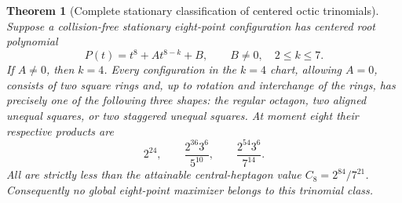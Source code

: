 \documentclass[11pt]{article}
\newtheorem{theorem}{Theorem}[section]
\theoremstyle{remark}
\numberwithin{equation}{section}
\begin{document}
\begin{theorem}[Complete stationary classification of centered octic trinomials]
\label{thm:eight-trinomial-classification}
Suppose a collision-free stationary eight-point configuration has
centered root polynomial
\[
 P(t)=t^8+A t^{8-k}+B,\qquad B\ne0,\quad 2\le k\le7.
\]
If $A\ne0$, then $k=4$. Every configuration in the $k=4$ chart,
allowing $A=0$, consists of two square rings and, up to rotation
and interchange of the rings, has precisely one of the following three shapes:
the regular octagon, two aligned unequal squares, or two staggered
unequal squares. At moment eight their respective products are
\begin{equation}\label{eq:eight-two-square-values}
 2^{24},\qquad \frac{2^{36}3^6}{5^{10}},\qquad
 \frac{2^{54}3^6}{7^{14}}.
\end{equation}
All are strictly less than the attainable central-heptagon value
$C_8=2^{84}/7^{21}$. Consequently no global eight-point maximizer
belongs to this trinomial class.
\end{theorem}
\end{document}
